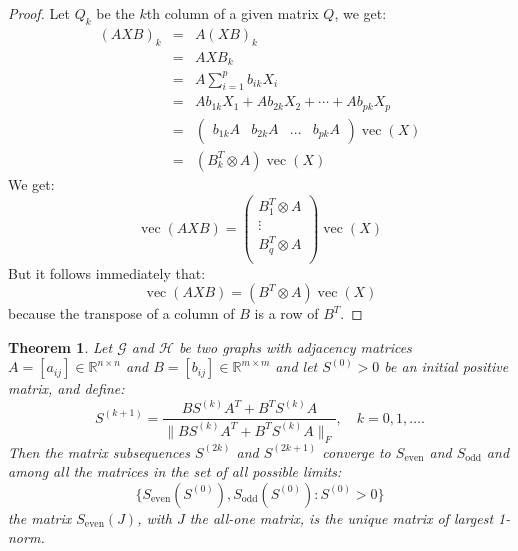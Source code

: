\documentclass[a4paper,11pt]{report}
\newtheorem{theorem}{Theorem}[section]
\newcommand{\R}{{\mathbb R}}
\newcommand{\graf}{\mathscr{G}}
\newcommand{\grafeen}{\mathscr{H}}
\newcommand{\vect}{\operatorname{vec}}
\begin{document}
\begin{proof}
  Let $Q_k$ be the $k$th column of a given matrix $Q$, we get:
  \begin{eqnarray*}
    (AXB)_k &=& A(XB)_k\\
    &=& AXB_k\\
    &=& A \sum_{i=1}^p b_{ik}X_{i}\\
    &=& Ab_{1k}X_1 + Ab_{2k}X_2 + \cdots + Ab_{pk}X_p\\
    &=& \begin{pmatrix}
    b_{1k}A & b_{2k}A & \ldots & b_{pk}A \end{pmatrix}\vect(X)\\
    &=& (B^T_k \otimes A)\vect(X)
  \end{eqnarray*}
 We get:
 $$\vect(AXB) = \begin{pmatrix} 
 B^T_1 \otimes A\\
 \vdots\\
 B^T_q \otimes A\\
 \end{pmatrix} \vect(X)$$
 But it follows immediately that:
 $$\vect(AXB) = (B^T\otimes A)\vect(X)$$
 because the transpose of a column of $B$ is a row of $B^T$.
\end{proof}

\begin{theorem}\label{frobvorm}
  Let $\graf$ and $\grafeen$ be two graphs with adjacency matrices $A = [a_{ij}] \in \R^{n\times n}$ 
  and $B = [b_{ij}] \in \R^{m\times m}$ and let $S^{(0)} > 0$ be an initial positive matrix, and 
  define:
  $$S^{(k+1)} = \frac{BS^{(k)}A^T + B^TS^{(k)}A}{\|BS^{(k)}A^T + B^TS^{(k)}A\|_F}, \quad k = 
  0,1,\ldots.$$
  Then the matrix subsequences $S^{(2k)}$ and $S^{(2k+1)}$ converge to $S_\text{even}$ 
  and $S_\text{odd}$ and among all the matrices in the set of all possible 
  limits:
  $$\{S_\text{even}(S^{(0)}), S_\text{odd}(S^{(0)}): S^{(0)} > 0 \}$$
  the matrix $S_\text{even}(J)$, with $J$ the all-one matrix, is the unique matrix of largest 
  1-norm.
  \end{theorem}
\end{document}
